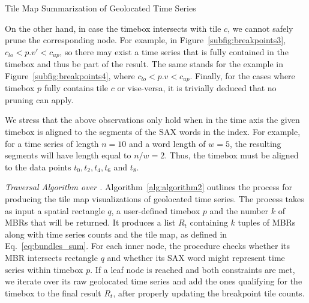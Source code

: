 \begin{algorithm}[ht!]
{  }
  \vspace{6pt}
  \caption{Tile Map Summarization of Geolocated Time Series}
  \label{alg:algorithm2}
\end{algorithm}

On the other hand, in case the timebox intersects with tile $c$, we cannot safely prune the corresponding node. For example, in Figure~\ref{subfig:breakpoints3}, $c_{lo} < p.v' < c_{up}$, so there may exist a time series that is fully contained in the timebox and thus be part of the result. The same stands for the example in Figure~\ref{subfig:breakpoints4}, where  $c_{lo} < p.v < c_{up}$. Finally, for the cases where timebox $p$ fully contains tile $c$ or vise-versa, it is trivially deduced that no pruning can apply.

We stress that the above observations only hold when in the time axis the given timebox is aligned to the segments of the SAX words in the index. For example, for a time series of length $n=10$ and a word length of $w=5$, the resulting segments will have length equal to $n/w=2$. Thus, the timebox must be aligned to the data points $t_0, t_2, t_4, t_6$ and $t_8$.

\emph{Traversal Algorithm over \hisax.} Algorithm~\ref{alg:algorithm2} outlines the process for producing the tile map visualizations of geolocated time series. The process takes as input a spatial rectangle $q$, a user-defined timebox $p$ and the number $k$ of MBRs that will be returned. It produces a list $R_t$ containing $k$ tuples of MBRs along with time series counts and the tile map, as defined in Eq.~\ref{eq:bundles_sum}. For each inner node, the procedure checks whether its MBR intersects rectangle $q$ and whether its SAX word might represent time series within timebox $p$. If a leaf node is reached and both constraints are met, we iterate over its raw geolocated time series and add the ones qualifying for the timebox to the final result $R_t$, after properly updating the breakpoint tile counts.

